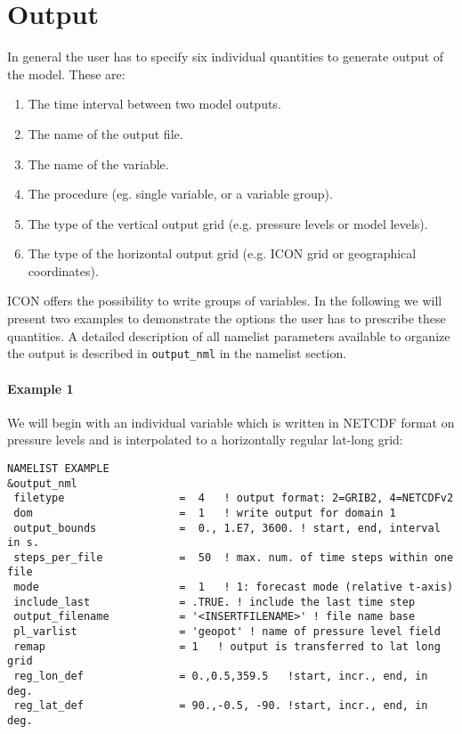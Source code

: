 \chapter{Output}



In general the user has to specify six individual quantities to generate output of the model. These are:

\begin{enumerate}
\item{The time interval between two model outputs.}
\item{The name of the output file.}
\item{The name of the variable.}
\item{The procedure (eg. single variable, or a variable group).}
\item{The type of the vertical output grid (e.g. pressure levels or model levels).}
\item{The type of the horizontal output grid (e.g. ICON grid or geographical coordinates).}
\end{enumerate}

ICON offers the possibility to write groups of variables. 
In the following we will present two examples to demonstrate the options the user has to prescribe these quantities. A detailed description of all namelist parameters available to organize the output is described  in \verb+output_nml+ in the namelist section.

\subsubsection{Example 1}

We will begin with an individual variable which is written in NETCDF format on pressure levels and is interpolated to a horizontally regular lat-long grid:

\begin{Verbatim}[frame=single]
NAMELIST EXAMPLE
&output_nml
 filetype                  =  4   ! output format: 2=GRIB2, 4=NETCDFv2
 dom                       =  1   ! write output for domain 1
 output_bounds             =  0., 1.E7, 3600. ! start, end, interval in s.
 steps_per_file            =  50  ! max. num. of time steps within one file
 mode                      =  1   ! 1: forecast mode (relative t-axis)
 include_last              = .TRUE. ! include the last time step
 output_filename           = '<INSERTFILENAME>' ! file name base
 pl_varlist                = 'geopot' ! name of pressure level field
 remap                     = 1   ! output is transferred to lat long grid
 reg_lon_def               = 0.,0.5,359.5   !start, incr., end, in deg.
 reg_lat_def               = 90.,-0.5, -90. !start, incr., end, in deg.
\end{Verbatim}



